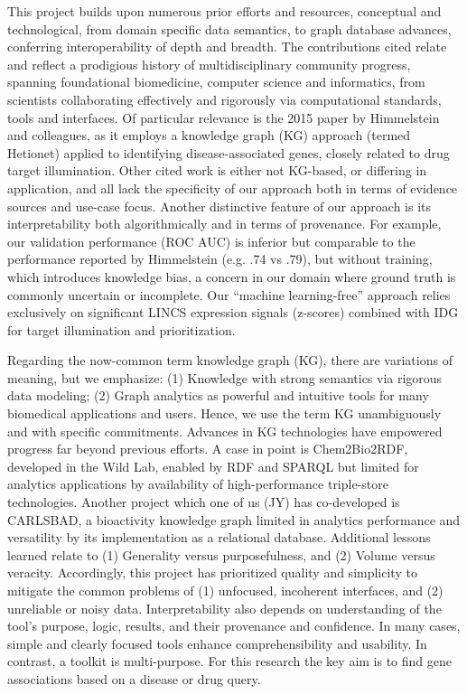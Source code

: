 This project builds upon numerous prior efforts and resources, conceptual and technological, from domain specific data semantics, to graph database advances, conferring interoperability of depth and breadth\cite{Chen2010-to,Sirota2011-tl,Li2013-th,Callahan2013-ev,Himmelstein2015-ie,Greene2015-ix,Himmelstein2017-jy,Digles2018-qs,Szklarczyk2019-bc,Morton2019-le,Ochoa2020-ew}. The contributions cited relate and reflect a prodigious history of multidisciplinary community progress, spanning foundational biomedicine, computer science and informatics, from scientists collaborating effectively and rigorously via computational standards, tools and interfaces. Of particular relevance is the 2015 paper\cite{Himmelstein2015-ie} by Himmelstein and colleagues, as it employs a knowledge graph (KG) approach (termed Hetionet) applied to identifying disease-associated genes, closely related to drug target illumination. Other cited work is either not KG-based, or differing in application, and all lack the specificity of our approach both in terms of evidence sources and use-case focus. Another distinctive feature of our approach is its interpretability both algorithmically and in terms of provenance. For example, our validation performance (ROC AUC) is inferior but comparable to the performance reported by Himmelstein (e.g. .74 vs .79), but without training, which introduces knowledge bias, a concern in our domain where ground truth is commonly uncertain or incomplete. Our “machine learning-free” approach relies exclusively on significant LINCS expression signals (z-scores) combined with IDG for target illumination and prioritization. 

Regarding the now-common term knowledge graph (KG), there are variations of meaning, but we emphasize: (1) Knowledge with strong semantics via rigorous data modeling; (2) Graph analytics as powerful and intuitive tools for many biomedical applications and users\cite{Lysenko2016-ba}.  Hence, we use the term KG unambiguously and with specific commitments. Advances in KG technologies have empowered progress far beyond previous efforts. A case in point is Chem2Bio2RDF\cite{Chen2010-to,Chen2012-iq}, developed in the Wild Lab, enabled by RDF and SPARQL but limited for analytics applications by availability of high-performance triple-store technologies. Another project which one of us (JY) has co-developed is CARLSBAD\cite{Mathias2013-hj}, a bioactivity knowledge graph limited in analytics performance and versatility by its implementation as a relational database. Additional lessons learned relate to (1) Generality versus purposefulness, and (2) Volume versus veracity. Accordingly, this project has prioritized quality and simplicity to mitigate the common problems of (1) unfocused, incoherent interfaces, and (2) unreliable or noisy data. Interpretability also depends on understanding of the tool's purpose, logic, results, and their provenance and confidence. In many cases, simple and clearly focused tools enhance comprehensibility and usability. In contrast, a toolkit is multi-purpose. For this research the key aim is to find gene associations based on a disease or drug query.


